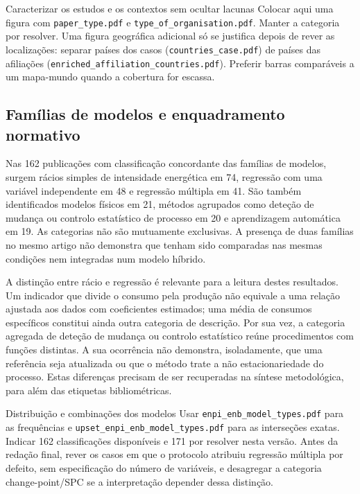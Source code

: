 {Caracterizar os estudos e os contextos sem ocultar lacunas}
{Colocar aqui uma figura com \texttt{paper\_type.pdf} e
\texttt{type\_of\_organisation.pdf}. Manter a categoria por
resolver. Uma figura geográfica adicional só se justifica depois
de rever as localizações: separar países dos casos
(\texttt{countries\_case.pdf}) de países das afiliações
(\texttt{enriched\_affiliation\_countries.pdf}). Preferir barras
comparáveis a um mapa-mundo quando a cobertura for escassa.}%

\subsection{Famílias de modelos e enquadramento normativo}

Nas 162 publicações com classificação concordante das famílias de
modelos, surgem rácios simples de intensidade energética em 74,
regressão com uma variável independente em 48 e regressão múltipla
em 41. São também identificados modelos físicos em 21, métodos
agrupados como deteção de mudança ou controlo estatístico de
processo em 20 e aprendizagem automática em 19. As categorias
não são mutuamente exclusivas. A presença de duas famílias no
mesmo artigo não demonstra que tenham sido comparadas nas mesmas
condições nem integradas num modelo híbrido.

A distinção entre rácio e regressão é relevante para a leitura
destes resultados. Um indicador que divide o consumo pela produção
não equivale a uma relação ajustada aos dados com coeficientes
estimados; uma média de consumos específicos constitui ainda
outra categoria de descrição. Por sua vez, a categoria agregada
de deteção de mudança ou controlo estatístico reúne procedimentos
com funções distintas. A sua ocorrência não demonstra, isoladamente,
que uma referência seja atualizada ou que o método trate a
não estacionariedade do processo. Estas diferenças precisam de
ser recuperadas na síntese metodológica, para além das etiquetas
bibliométricas.

{Distribuição e combinações dos modelos}
{Usar \texttt{enpi\_enb\_model\_types.pdf} para as frequências
e \texttt{upset\_enpi\_enb\_model\_types.pdf} para as
interseções exatas. Indicar 162 classificações disponíveis e 171
por resolver nesta versão. Antes da redação final, rever os casos
em que o protocolo atribuiu regressão múltipla por defeito, sem
especificação do número de variáveis, e desagregar a categoria
change-point/SPC se a interpretação depender dessa distinção.}%

